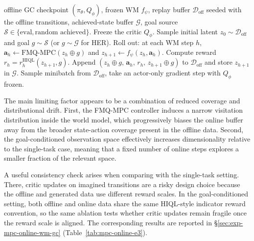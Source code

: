 \begin{algorithm}[h]
\caption{Goal-conditioned online-in-WM with HER. The single-task
controller of \S\ref{sec:mpcd-online-wm} is the special case in
which the goal is fixed across the entire online phase and the HER
relabelling step is skipped.}
\label{alg:owm-gc}
\begin{algorithmic}[1]
\Require offline GC checkpoint $(\pi_\theta, Q_\phi)$, frozen WM $f_\psi$, replay buffer $\mathcal{D}_{\text{off}}$ seeded with the offline transitions, achieved-state buffer $\mathcal{G}$, goal source $\mathcal{S} \in \{\text{eval}, \text{random achieved}\}$.
\State Freeze the critic $Q_\phi$.
    \State Sample initial latent $z_0 \sim \mathcal{D}_{\text{off}}$ and goal $g \sim \mathcal{S}$ (or $g \sim \mathcal{G}$ for HER).
    \State Roll out: at each WM step $h$, $\mathbf{a}_h \leftarrow \text{FMQ-MPC}(z_h \oplus g)$ and $z_{h+1} \leftarrow f_\psi(z_h, \mathbf{a}_h)$.
    \State Compute reward $r_h = r_h^{\text{HIQL}}(z_{h+1}, g)$.
    \State Append $(z_h \oplus g,\, \mathbf{a}_h,\, r_h,\, z_{h+1} \oplus g)$ to $\mathcal{D}_{\text{off}}$ and store $z_{h+1}$ in $\mathcal{G}$.
    \State Sample minibatch from $\mathcal{D}_{\text{off}}$, take an actor-only gradient step with $Q_\phi$ frozen.
\EndFor
\end{algorithmic}
\end{algorithm}

The main limiting factor appears to be a combination of reduced
coverage and distributional drift. First, the FMQ-MPC controller
induces a narrow visitation distribution inside the world model, which
progressively biases the online buffer away from the broader
state-action coverage present in the offline data. Second, the
goal-conditioned observation space effectively increases dimensionality
relative to the single-task case, meaning that a fixed number of online
steps explores a smaller fraction of the relevant space.

A useful consistency check arises when comparing with the single-task
setting. There, critic updates on imagined transitions are a risky
design choice because the offline and generated data use different
reward scales. In the goal-conditioned setting, both offline and online
data share the same HIQL-style indicator reward convention, so the same
ablation tests whether critic updates remain fragile once the reward
scale is aligned. The corresponding results are reported in
\S\ref{sec:exp-mpc-online-wm-gc} (Table~\ref{tab:mpc-online-e3}).

